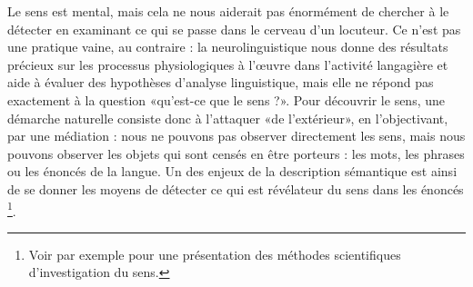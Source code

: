 \begin{refsegment}
Le sens est mental, mais cela ne nous aiderait pas énormément de chercher à le détecter en examinant ce qui se passe dans le cerveau d'un locuteur.  Ce n'est pas une pratique vaine, au contraire : la neurolinguistique nous donne des résultats précieux sur les processus physiologiques à l'\oe uvre dans l'activité langagière et aide  à évaluer des hypothèses d'analyse linguistique, mais elle ne répond pas exactement à la question «qu'est-ce que le sens ?».  
Pour découvrir le sens, une démarche naturelle consiste donc à l'attaquer «de l'extérieur», en l'objectivant, par une médiation : nous ne pouvons pas observer directement les sens, mais nous pouvons observer les objets qui sont censés en être porteurs : les mots, les phrases ou les énoncés de la langue.  Un des enjeux de la description sémantique est ainsi de se donner les moyens 
de détecter ce qui est révélateur du sens dans les énoncés%
\footnote{Voir par exemple \cite{Krfk:11x} pour une présentation des méthodes scientifiques d'investigation du sens.}. 



\end{refsegment}
